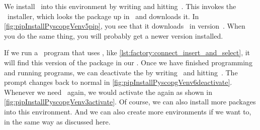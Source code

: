 We install \psycopg\ into this environment by writing  and hitting~\keys{\enter}.
This invokes the \pip\ installer, which looks the package up in \pypi\ and downloads it.
In \cref{fig:pipInstallPyscopgVenv5pip}, you see that it downloads \psycopg\ in version~.
When you do the same thing, you will probably get a newer version installed.

If we run a \python\ program that uses \psycopg, like \cref{lst:factory:connect_insert_and_select}, it will find this version of the package in our .
Once we have finished programming and running programs, we can deactivate the  by writing~ and hitting~\keys{\enter}.
The prompt changes back to normal in \cref{fig:pipInstallPyscopgVenv6deactivate}.
Whenever we need \psycopg\ again, we would activate the  again as shown in \cref{fig:pipInstallPyscopgVenv3activate}.
Of course, we can also install more packages into this environment.
And we can also create more environments if we want to, in the same way as discussed here.%
\FloatBarrier%
\endhsection%
%
%
\label{sec:cloningExamplesRepoAndInstallingPsycopgUnderPyCharm}%
%
